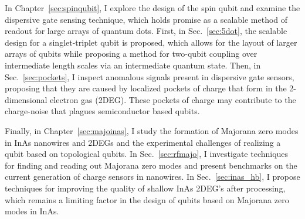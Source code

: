 In Chapter~\ref{sec:spinqubit}, I explore the design of the spin qubit and examine the dispersive gate sensing technique,
which holds promise as a scalable method of readout for large arrays of quantum dots. First, in Sec.~\ref{sec:5dot},
the scalable design for a singlet-triplet qubit is proposed, which allows for the layout of larger arrays of qubits
while proposing a method for two-qubit coupling over intermediate length scales via an intermediate quantum state.
Then, in Sec.~\ref{sec:pockets}, I inspect anomalous signals present in dispersive gate sensors, proposing that they
are caused by localized pockets of charge that form in the 2-dimensional electron gas (2DEG). These pockets of charge may
contribute to the charge-noise that plagues semiconductor based qubits.

Finally, in Chapter~\ref{sec:majoinas}, I study the formation of Majorana zero modes in InAs nanowires and
2DEGs and the experimental challenges of realizing a qubit based on topological qubits. In Sec.~\ref{sec:rfmajo}, I investigate
techniques for finding and reading out Majorana zero modes and present benchmarks on the current
generation of charge sensors in nanowires. In Sec.~\ref{sec:inas_hb}, I propose techniques for improving the quality
of shallow InAs 2DEG's after processing, which remains a limiting factor in the design of qubits based on Majorana zero
modes in InAs.